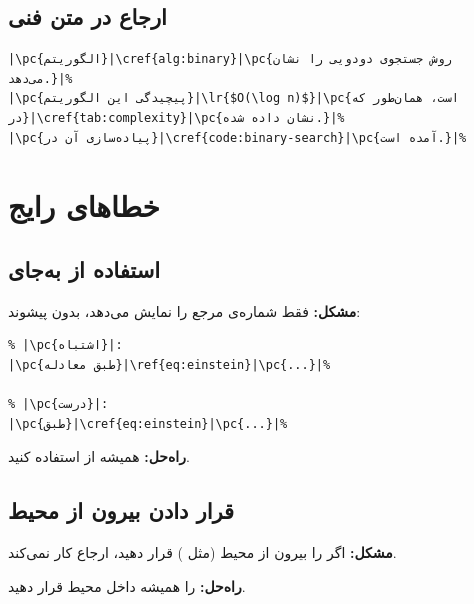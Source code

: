 \subsection{ارجاع در متن فنی}
\label{sec:cross-refs-example-technical}

\begin{latin}
\begin{verbatim}
|\pc{الگوریتم}|\cref{alg:binary}|\pc{روش جستجوی دودویی را نشان می‌دهد.}|%
|\pc{پیچیدگی این الگوریتم}|\lr{$O(\log n)$}|\pc{است، همان‌طور که در}|\cref{tab:complexity}|\pc{نشان داده شده.}|%
|\pc{پیاده‌سازی آن در}|\cref{code:binary-search}|\pc{آمده است.}|%
\end{verbatim}
\end{latin}


\section{خطاهای رایج}
\label{sec:cross-refs-mistakes}

\subsection{استفاده از  به‌جای }
\label{sec:cross-refs-mistake-ref}

\textbf{مشکل:}  فقط شماره‌ی مرجع را
نمایش می‌دهد، بدون پیشوند:

\begin{latin}
\begin{verbatim}
% |\pc{اشتباه}|:
|\pc{طبق معادله}|\ref{eq:einstein}|\pc{...}|%

% |\pc{درست}|:
|\pc{طبق}|\cref{eq:einstein}|\pc{...}|%
\end{verbatim}
\end{latin}

\textbf{راه‌حل:} همیشه از  استفاده
کنید.

\subsection{قرار دادن  بیرون از محیط}
\label{sec:cross-refs-mistake-label}

\textbf{مشکل:} اگر  را بیرون از
محیط (مثل ) قرار دهید، ارجاع
کار نمی‌کند.

\textbf{راه‌حل:}  را همیشه داخل محیط
قرار دهید.

